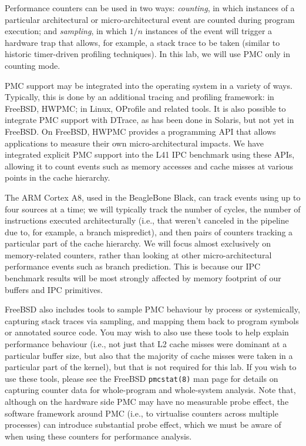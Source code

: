 \documentclass[a4paper,10pt]{article}
\begin{document}
Performance counters can be used in two ways: \textit{counting}, in which
instances of a particular architectural or micro-architectural event are
counted during program execution; and \textit{sampling}, in which $1/n$
instances of the event will trigger a hardware trap that allows, for example,
a stack trace to be taken (similar to historic timer-driven profiling
techniques).
In this lab, we will use PMC only in counting mode.

PMC support may be integrated into the operating system in a variety of ways.
Typically, this is done by an additional tracing and profiling framework: in
FreeBSD, HWPMC; in Linux, OProfile and related tools.
It is also possible to integrate PMC support with DTrace, as has been done in
Solaris, but not yet in FreeBSD.
On FreeBSD, HWPMC provides a programming API that allows applications to
measure their own micro-architectural impacts.
We have integrated explicit PMC support into the L41 IPC benchmark using these
APIs, allowing it to count events such as memory accesses and cache misses at
various points in the cache hierarchy.

The ARM Cortex A8, used in the BeagleBone Black, can track events using up to
four sources at a time; we will typically track the number of cycles, the
number of instructions executed architecturally (i.e., that weren't canceled
in the pipeline due to, for example, a branch mispredict), and then pairs of
counters tracking a particular part of the cache hierarchy.
We will focus almost exclusively on memory-related counters, rather than
looking at other micro-architectural performance events such as branch
prediction.
This is because our IPC benchmark results will be most strongly affected by
memory footprint of our buffers and IPC primitives.

FreeBSD also includes tools to sample PMC behaviour by process or
systemically, capturing stack traces via sampling, and mapping them back to
program symbols or annotated source code.
You may wish to also use these tools to help explain performance behaviour
(i.e., not just that L2 cache misses were dominant at a particular buffer
size, but also that the majority of cache misses were taken in a particular
part of the kernel), but that is not required for this lab.
If you wish to use these tools, please see the FreeBSD \texttt{pmcstat(8)}
man page for details on capturing counter data for whole-program and
whole-system analysis.
Note that, although on the hardware side PMC may have no measurable probe
effect, the software framework around PMC (i.e., to virtualise counters across
multiple processes) can introduce substantial probe effect, which we must be
aware of when using these counters for performance analysis.
\end{document}
